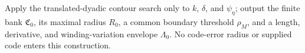 Apply the translated-dyadic contour search only to \(k\), \(\delta\), and \(\psi_\eta\); output the finite bank \(\mathfrak C_0\), its maximal radius \(R_0\), a common boundary threshold \(\rho_M\), and a length, derivative, and winding-variation envelope \(\Lambda_0\). No code-error radius or supplied code enters this construction.